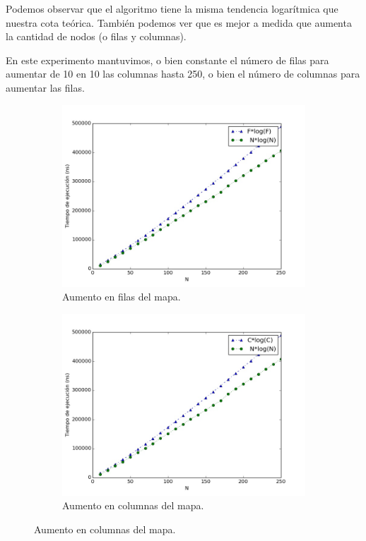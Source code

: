 \documentclass[spanish,12pt]{article}
\begin{document}
Podemos observar que el algoritmo tiene la misma tendencia logarítmica que nuestra cota teórica. También podemos ver que es mejor a medida que aumenta la cantidad de nodos (o filas y columnas).


En este experimento mantuvimos, o bien constante el número de filas para aumentar de 10 en 10 las columnas hasta 250, o bien el número de columnas para aumentar las filas.

\clearpage
\begin{figure}[!ht]
    \centering
    \begin{subfigure}{0.45\textwidth}
        \includegraphics[width=\textwidth]{soloFilas}
        \caption{Aumento en filas del mapa.}
        \label{}
    \end{subfigure}
    \begin{subfigure}{0.45\textwidth}
        \includegraphics[width=\textwidth]{soloColumnas}
        \caption{Aumento en columnas del mapa.}
        \label{}
    \end{subfigure}
\end{figure}
\end{document}
